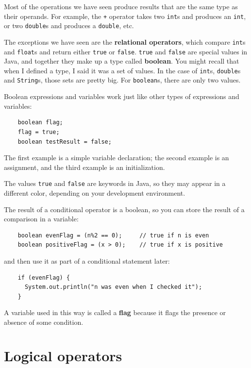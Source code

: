 \documentclass[12pt]{book}
\theoremstyle{exercise}
\begin{document}
Most of the operations we have seen produce results that are
the same type as their operands.  For example, the {\tt +} operator
takes two {\tt int}s and produces an {\tt int}, or two {\tt double}s
and produces a {\tt double}, etc.


The exceptions we have seen are the {\bf relational operators}, which
compare {\tt int}s and {\tt float}s and return either {\tt true} or
{\tt false}.  {\tt true} and {\tt false} are special values in Java,
and together they make up a type called {\bf boolean}.  You might
recall that when I defined a type, I said it was a set of values.  In
the case of {\tt int}s, {\tt double}s and {\tt String}s, those sets
are pretty big.  For {\tt boolean}s, there are only two values.

Boolean expressions and variables work just like other types of
expressions and variables:

\begin{lstlisting}
    boolean flag;
    flag = true;
    boolean testResult = false;
\end{lstlisting}
%
The first example is a simple variable declaration;
the second example is an assignment, and the third example is an
initialization.

The values {\tt true} and {\tt false}
are keywords in Java, so they may appear in a different color,
depending on your development environment.


The result of a conditional operator is a boolean,
so you can store the result of a comparison in a variable:

\begin{lstlisting}
    boolean evenFlag = (n%2 == 0);     // true if n is even
    boolean positiveFlag = (x > 0);    // true if x is positive
\end{lstlisting}
%
and then use it as part of a conditional statement later:

\begin{lstlisting}
    if (evenFlag) {
      System.out.println("n was even when I checked it");
    }
\end{lstlisting}
%
A variable used in this way is called a {\bf flag}
because it flags the presence or absence of some condition.


\section{Logical operators}
\end{document}
